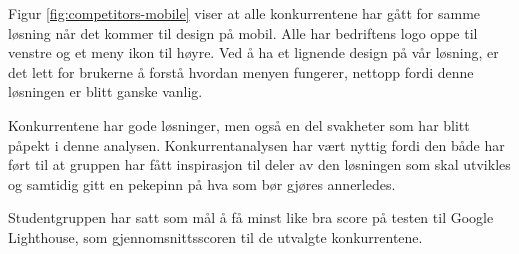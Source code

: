 Figur \ref{fig:competitors-mobile} viser at alle konkurrentene har gått for samme løsning når det kommer til design på mobil. Alle har bedriftens logo oppe til venstre og et meny ikon til høyre. Ved å ha et lignende design på vår løsning, er det lett for brukerne å forstå hvordan menyen fungerer, nettopp fordi denne løsningen er blitt ganske vanlig.

Konkurrentene har gode løsninger, men også en del svakheter som har blitt påpekt i denne analysen. Konkurrentanalysen har vært nyttig fordi den både har ført til at gruppen har fått inspirasjon til deler av den løsningen som skal utvikles og samtidig gitt en pekepinn på hva som bør gjøres annerledes.

Studentgruppen har satt som mål å få minst like bra score på testen til Google Lighthouse, som gjennomsnittsscoren til de utvalgte konkurrentene.
